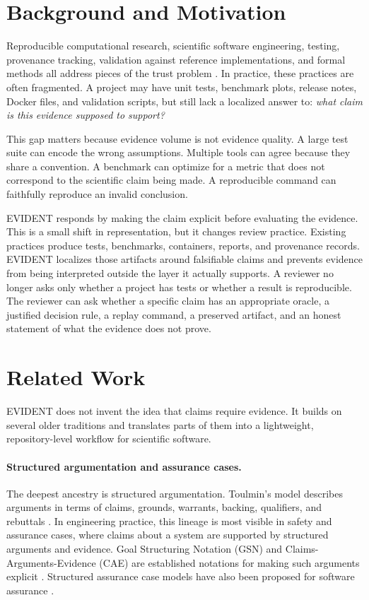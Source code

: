 \documentclass[10pt,twoside]{article}
\newcounter{note}
\begin{document}
\section{Background and Motivation}

Reproducible computational research, scientific software engineering, testing,
provenance tracking, validation against reference implementations, and formal
methods all address pieces of the trust problem
\citep{wilson2014best,sandve2013ten}. In practice, these practices are often
fragmented. A project may have unit tests, benchmark plots, release notes,
Docker files, and validation scripts, but still lack a localized answer to:
\emph{what claim is this evidence supposed to support?}

This gap matters because evidence volume is not evidence quality. A large test
suite can encode the wrong assumptions. Multiple tools can agree because they
share a convention. A benchmark can optimize for a metric that does not
correspond to the scientific claim being made. A reproducible command can
faithfully reproduce an invalid conclusion.

EVIDENT responds by making the claim explicit before evaluating the evidence.
This is a small shift in representation, but it changes review practice.
Existing practices produce tests, benchmarks, containers, reports, and
provenance records. EVIDENT localizes those artifacts around falsifiable claims
and prevents evidence from being interpreted outside the layer it actually
supports. A reviewer no longer asks only whether a project has tests or whether
a result is reproducible. The reviewer can ask whether a specific claim has an
appropriate oracle, a justified decision rule, a replay command, a preserved
artifact, and an honest statement of what the evidence does not prove.

\section{Related Work}

EVIDENT does not invent the idea that claims require evidence. It builds on
several older traditions and translates parts of them into a lightweight,
repository-level workflow for scientific software.

\paragraph{Structured argumentation and assurance cases.}
The deepest ancestry is structured argumentation. Toulmin's model describes
arguments in terms of claims, grounds, warrants, backing, qualifiers, and
rebuttals \citep{toulmin1958uses}. In engineering practice, this lineage is
most visible in safety and assurance cases, where claims about a system are
supported by structured arguments and evidence. Goal Structuring Notation (GSN)
and Claims-Arguments-Evidence (CAE) are established notations for making such
arguments explicit \citep{kelly2004goal,bloomfield2010building}. Structured
assurance case models have also been proposed for software assurance
\citep{rhodes2010software}.
\end{document}
